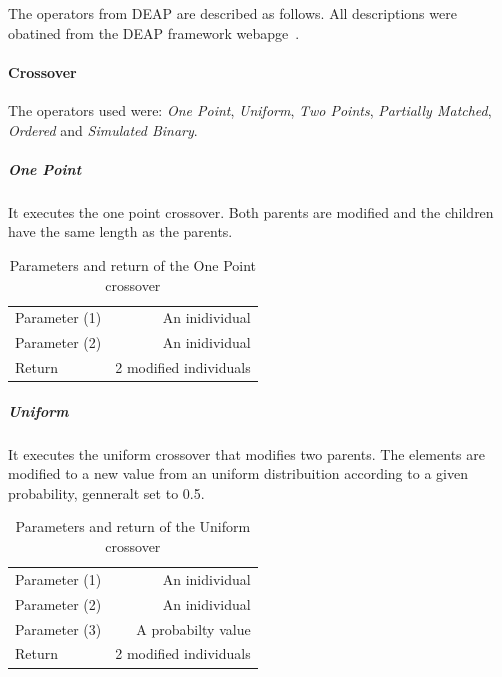 The operators from DEAP are described as follows. All descriptions were obatined from the DEAP framework webapge~\cite{webDeap}.\\

\paragraph{Crossover}
The operators used were: {\it One Point}, {\it Uniform}, {\it Two Points}, {\it Partially Matched}, {\it Ordered} and {\it Simulated Binary}.\\

\subparagraph{One Point}
It executes the one point crossover. Both parents are modified and the children have the same length as the parents.\\

\begin{table}[!h]
  \begin{center}
  \begin{tabular}{|l|r|}
    \hline
    Parameter (1) & An inidividual\\
    Parameter (2) & An inidividual\\
    Return & 2 modified individuals\\
    \hline    
  \end{tabular}
  \end{center}
  \caption{Parameters and return of the One Point crossover}
  \label{One Point}
\end{table}

\subparagraph{Uniform}
It executes the uniform crossover that modifies two parents. The elements are modified to a new value from an uniform distribuition according to a given probability, genneralt set to 0.5.\\

\begin{table}[!h]
  \begin{center}
  \begin{tabular}{|l|r|}
    \hline
    Parameter (1) & An inidividual\\
    Parameter (2) & An inidividual\\
    Parameter  (3) & A probabilty value\\
    Return & 2 modified individuals\\
    \hline    
  \end{tabular}
  \end{center}
  \caption{Parameters and return of the Uniform crossover}
  \label{Uniform}
\end{table}

